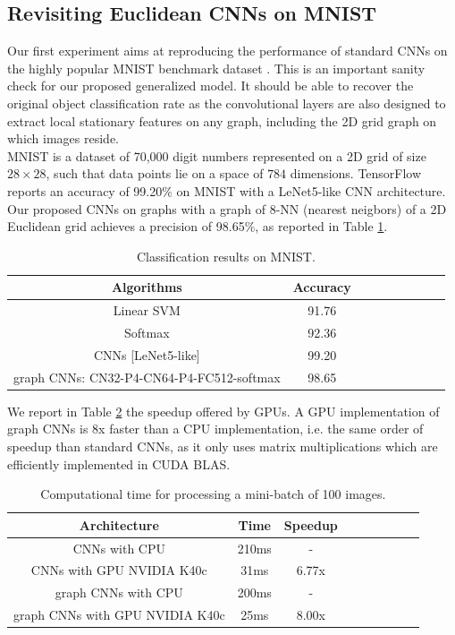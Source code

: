 \documentclass{article}
\begin{document}
 
\subsection{Revisiting Euclidean CNNs on MNIST}
\vspace{-0.2cm}
Our first experiment aims at reproducing the performance of standard CNNs on the highly popular MNIST benchmark dataset \cite{pro:LeCunBottouBengioHaffner98MNIST}. This is an important sanity check for our proposed generalized model. It should be able to recover the original object classification rate as the convolutional layers are also designed to extract local stationary features on any graph, including the 2D grid graph on which images reside. \\
MNIST is a dataset of 70,000 digit numbers represented on a 2D grid of size $28\times 28$, such that data points lie on a space of $784$ dimensions. TensorFlow reports an accuracy of 99.20\% on MNIST with a LeNet5-like CNN architecture. Our proposed CNNs on graphs with a graph of $8$-NN (nearest neigbors) of a 2D Euclidean grid achieves a precision of 98.65\%, as reported in Table \ref{tab1}.


\begin{table}[h!]
 \centering
{\small
\begin{tabular}{|c|c|c|c|c|c|c|c|c|}
\hline
 Algorithms & Accuracy  \\
\hline
Linear SVM & 91.76  \\
Softmax & 92.36  \\
CNNs [LeNet5-like] & 99.20  \\
graph CNNs: CN32-P4-CN64-P4-FC512-softmax & 98.65 \\
\hline
\end{tabular}
}
\caption{Classification results on MNIST.} 
\label{tab1}
\end{table}



\noindent
We report in Table \ref{tab2} the speedup offered by GPUs. A GPU implementation of graph CNNs is 8x faster than a CPU implementation, i.e. the same order of speedup than standard CNNs, as it only uses matrix multiplications which are efficiently implemented in CUDA BLAS.


\begin{table}[h!]
 \centering
{\small
\begin{tabular}{|c|c|c|c|c|c|c|c|c|}
\hline
 Architecture & Time  & Speedup \\
\hline
CNNs with CPU & 210ms & -\\
CNNs with GPU NVIDIA K40c & 31ms & 6.77x\\
graph CNNs with CPU & 200ms & -\\
graph CNNs  with GPU NVIDIA K40c & 25ms & 8.00x\\
\hline
\end{tabular}
}
\caption{Computational time for processing a mini-batch of 100 images.} 
\label{tab2}
\end{table}
\end{document}
